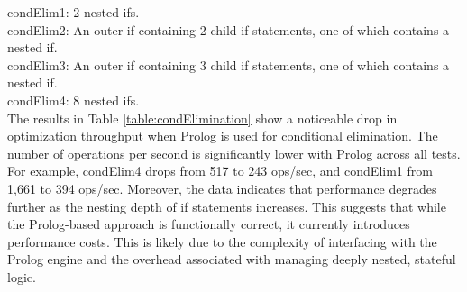 \noindent condElim1: 2 nested ifs.\\
condElim2: An outer if containing 2 child if statements, one of which contains a nested if.\\
condElim3: An outer if containing 3 child if statements, one of which contains a nested if.\\
condElim4: 8 nested ifs.\\

The results in Table \ref{table:condElimination} show a noticeable drop in optimization throughput when Prolog is used for conditional elimination. 
The number of operations per second is significantly lower with Prolog across all tests. 
For example, condElim4 drops from 517 to 243 ops/sec, and condElim1 from 1,661 to 394 ops/sec.
Moreover, the data indicates that performance degrades further as the nesting depth of if statements increases. 
This suggests that while the Prolog-based approach is functionally correct, it currently introduces performance costs. This is likely due to the complexity of interfacing with the Prolog engine and the overhead associated with managing deeply nested, stateful logic.